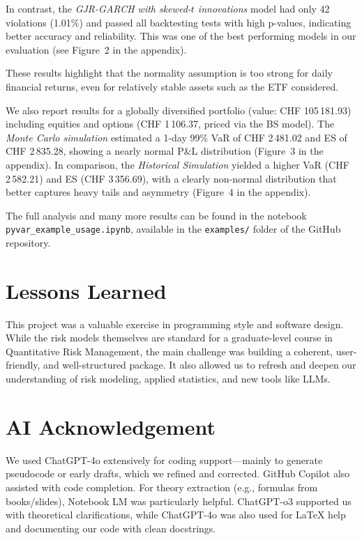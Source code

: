 \documentclass{article}
\begin{document}
In contrast, the \textit{GJR-GARCH with skewed-$t$ innovations} model had only 42 violations (1.01\%) and passed all backtesting tests with high p-values, indicating better accuracy and reliability. This was one of the best performing models in our evaluation (see Figure 2 in the appendix).

These results highlight that the normality assumption is too strong for daily financial returns, even for relatively stable assets such as the ETF considered.

We also report results for a globally diversified portfolio (value: CHF 105\,181.93) including equities and options (CHF 1\,106.37, priced via the BS model). The \textit{Monte Carlo simulation} estimated a 1-day 99\% VaR of CHF 2\,481.02 and ES of CHF 2\,835.28, showing a nearly normal P\&L distribution (Figure~3 in the appendix). In comparison, the \textit{Historical Simulation} yielded a higher VaR (CHF 2\,582.21) and ES (CHF 3\,356.69), with a clearly non-normal distribution that better captures heavy tails and asymmetry (Figure~4 in the appendix).

The full analysis and many more results can be found in the notebook \texttt{pyvar\_example\_usage.ipynb}, available in the \texttt{examples/} folder of the GitHub repository.


\section{Lessons Learned}

This project was a valuable exercise in programming style and software design. While the risk models themselves are standard for a graduate-level course in Quantitative Risk Management, the main challenge was building a coherent, user-friendly, and well-structured package. It also allowed us to refresh and deepen our understanding of risk modeling, applied statistics, and new tools like LLMs.


\section{AI Acknowledgement}

We used ChatGPT-4o extensively for coding support—mainly to generate pseudocode or early drafts, which we refined and corrected. GitHub Copilot also assisted with code completion. For theory extraction (e.g., formulas from books/slides), Notebook LM was particularly helpful.  
ChatGPT-o3 supported us with theoretical clarifications, while ChatGPT-4o was also used for LaTeX help and documenting our code with clean docstrings.
\end{document}
